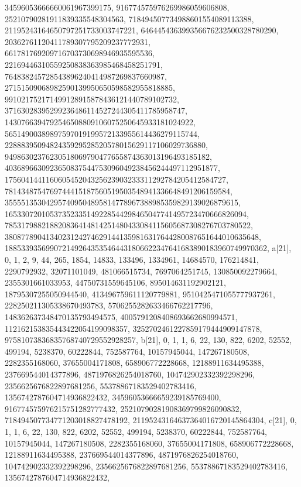 {{{   34596053666660061967399175, 916774575976269986059606808, 
   25210790281911839335548304563, 718494507734988601554089113388, 
   21195243164650797251733003747221, 646445436399356676232500328780290, 
   20362761120411789307795209237772931, 661781769209716703730698946935595536, 
   22169446310559250838363985468458251791, 
   764838245728543896240414987269837660987, 
   27151509068982590139950650598582955818885, 
   991021752171499128915878436121440789102732, 
   37163028395299236486114527244305411785958747, 
   1430766394792546508809106075250645933181024922, 
   56514900389897597019199572133955614436279115744, 
   2288839509482435929528520578015629117106029736880, 
   94986302376230518069790477655874363013196493185182, 
   4036896630923650837544753096049238456244497112951877, 
   175604144116060545204325623903233311292784205412584727, 
   7814348754769744415187560519503548941336648491206159584, 
   355551353042957409504895814778967388985359829139026879615, 
   16533072010537352335149228544298465047741495723470666826094, 
   785317988218820836414814251480433084115605687308276703780522, 
   38087789041340231242746291441359816317644280087651644010635648, 
   1885339356990721492643535464431806622347641683890183960749970362}}, 
 {a[21], {0, 1, 2, 9, 44, 265, 1854, 14833, 133496, 1334961, 14684570, 
   176214841, 2290792932, 32071101049, 481066515734, 7697064251745, 
   130850092279664, 2355301661033953, 44750731559645106, 895014631192902121, 
   18795307255050944540, 413496759611120779881, 9510425471055777937261, 
   228250211305338670493783, 5706255282633466762217796, 
   148362637348470135793494575, 4005791208408693662680994571, 
   112162153835443422054199098357, 3252702461227859179444909147878, 
   97581073836835768740729552928257}}, 
 {b[21], {0, 1, 1, 6, 22, 130, 822, 6202, 52552, 499194, 5238370, 60222844, 
   752587764, 10157945044, 147267180508, 2282355168060, 37655004171808, 
   658906772228668, 12188911634495388, 237669544014377896, 
   4871976826254018760, 104742902332392298296, 2356625676822897681256, 
   55378867183529402783416, 1356742787604714936822432, 
   34596053666659239185769400, 916774575976215751282777432, 
   25210790281908369799826090832, 718494507734771203018827478192, 
   21195243164637364016720145864304}}, 
 {c[21], {0, 1, 1, 6, 22, 130, 822, 6202, 52552, 499194, 5238370, 60222844, 
   752587764, 10157945044, 147267180508, 2282355168060, 37655004171808, 
   658906772228668, 12188911634495388, 237669544014377896, 
   4871976826254018760, 104742902332392298296, 2356625676822897681256, 
   55378867183529402783416, 1356742787604714936822432, 
}}}
